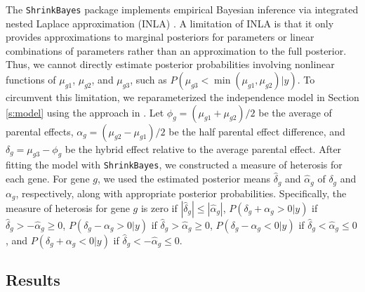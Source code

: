 \documentclass[useAMS,usenatbib,referee]{biom}
\begin{document}
The {\tt ShrinkBayes} package implements empirical Bayesian inference via integrated nested Laplace approximation (INLA) \citep{rue2009approximate,van2014shrinkbayes}. A limitation of INLA is that it only provides approximations to marginal posteriors for parameters or linear combinations of parameters rather than an approximation to the full posterior. Thus, we cannot directly estimate posterior probabilities involving nonlinear functions of $\mu_{g1}$, $\mu_{g2}$, and $\mu_{g3}$, such as $P(\mu_{g3} < \min(\mu_{g1},\mu_{g2})|y)$. To circumvent this limitation, we reparameterized the independence model in Section \ref{s:model} using the approach in \cite{ji2014estimation}. 
Let $\phi_g = (\mu_{g1}+\mu_{g2})/2$ be the average of parental effects, $\alpha_g = (\mu_{g2}-\mu_{g1})/2$ be the half parental effect difference, and $\delta_g = \mu_{g3} - \phi_g$ be the hybrid effect relative to the average parental effect. After fitting the model with {\tt ShrinkBayes}, we constructed a measure of heterosis for each gene. For gene $g$, we used the estimated posterior means $\hat{\delta}_g$ and $\hat{\alpha}_g$ of $\delta_g$ and $\alpha_g$, respectively, along with appropriate posterior probabilities. Specifically, the measure of heterosis for gene $g$ is zero if $|\hat{\delta}_g| \le |\hat{\alpha}_g|$, $P(\delta_g + \alpha_g > 0 |y)$ if $\hat{\delta}_g > -\hat{\alpha}_g \ge 0$, $P(\delta_g - \alpha_g > 0 |y)$ if $\hat{\delta}_g > \hat{\alpha}_g \ge 0$, $P(\delta_g - \alpha_g < 0 |y)$ if $\hat{\delta}_g < \hat{\alpha}_g \le 0$, and $P(\delta_g + \alpha_g < 0 |y)$ if $\hat{\delta}_g < -\hat{\alpha}_g \le 0$.  


\subsection{Results}
\end{document}
